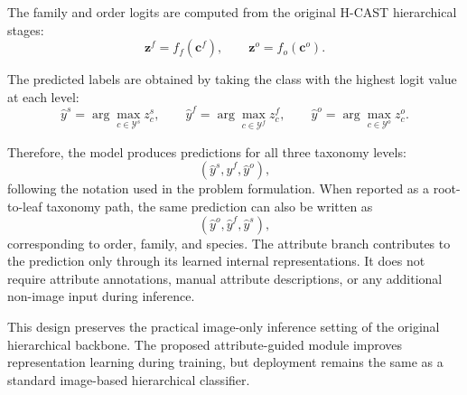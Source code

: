 The family and order logits are computed from the original H-CAST hierarchical stages:
\begin{equation}
    \mathbf{z}^{f}
    =
    f_f(\mathbf{c}^{f}),
    \qquad
    \mathbf{z}^{o}
    =
    f_o(\mathbf{c}^{o}).
\end{equation}

The predicted labels are obtained by taking the class with the highest logit value at each level:
\begin{equation}
    \hat{y}^{s}
    =
    \arg\max_{c \in \mathcal{Y}^{s}} z^{s}_{c},
    \qquad
    \hat{y}^{f}
    =
    \arg\max_{c \in \mathcal{Y}^{f}} z^{f}_{c},
    \qquad
    \hat{y}^{o}
    =
    \arg\max_{c \in \mathcal{Y}^{o}} z^{o}_{c}.
\end{equation}

Therefore, the model produces predictions for all three taxonomy levels:
\begin{equation}
    (\hat{y}^{s}, \hat{y}^{f}, \hat{y}^{o}),
\end{equation}
following the notation used in the problem formulation. When reported as a root-to-leaf taxonomy path, the same prediction can also be written as
\begin{equation}
    (\hat{y}^{o}, \hat{y}^{f}, \hat{y}^{s}),
\end{equation}
corresponding to order, family, and species. The attribute branch contributes to the prediction only through its learned internal representations. It does not require attribute annotations, manual attribute descriptions, or any additional non-image input during inference.

This design preserves the practical image-only inference setting of the original hierarchical backbone. The proposed attribute-guided module improves representation learning during training, but deployment remains the same as a standard image-based hierarchical classifier.